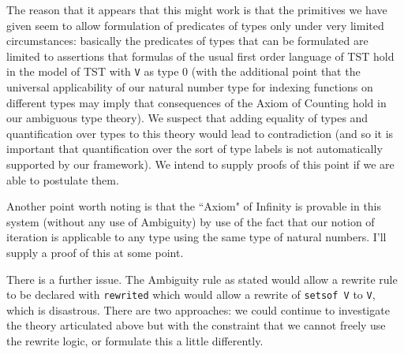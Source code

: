 \documentclass[12pt]{article}
\begin{document}
The reason that it appears that this might work is that the primitives we have given seem to allow formulation of predicates of types only under very limited circumstances:  basically the predicates of types that can be formulated are limited to assertions that formulas of the usual first order language of TST hold in the model of TST with {\tt V} as type 0 (with the additional point that the universal applicability of our natural number type for indexing functions on different types may imply that consequences of the Axiom of Counting hold in our ambiguous type theory).    We suspect that adding equality of types and quantification over types to this theory would lead to contradiction (and so it is important that quantification over the sort of type labels is not automatically supported by our framework).  We intend to supply proofs of this point if we are able to postulate them.

Another point worth noting is that the ``Axiom" of Infinity is provable in this system (without any use of Ambiguity) by use of the fact that our notion of iteration is applicable to any type using the same type of natural numbers.  I'll supply a proof of this at some point.

There is a further issue.  The Ambiguity rule as stated would allow a rewrite rule to be declared with {\tt rewrited} which would allow a rewrite of {\tt setsof V} to {\tt V}, which is disastrous.  There are two approaches:  we could continue to investigate the theory articulated above but with the constraint
that we cannot freely use the rewrite logic, or formulate this a little differently.
\end{document}
